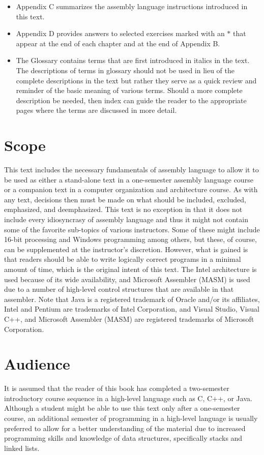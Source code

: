 \documentclass[10pt]{book}
\begin{document}
\begin{itemize}
  \item Appendix C summarizes the assembly language instructions introduced in this text.
  \item Appendix D provides answers to selected exercises marked with an $*$ that appear at the end of each chapter and at the end of Appendix B.
  \item The Glossary contains terms that are first introduced in italics in the text. The descriptions of terms in glossary should not be used in lieu of the complete descriptions in the text but rather they serve as a quick review and reminder of the basic meaning of various terms. Should a more complete description be needed, then index can guide the reader to the appropriate pages where the terms are discussed in more detail.
\end{itemize}
\section{Scope}
This text includes the necessary fundamentals of assembly language to allow it to be used as either a stand-alone text in a one-semester assembly language course or a companion text in a computer organization and architecture course. As with any text, decisions then must be made on what should be included, excluded, emphasized, and deemphasized. This text is no exception in that it does not include every idiosyncrasy of assembly language and thus it might not contain some of the favorite sub-topics of various instructors. Some of these might include 16-bit processing and Windows programming among others, but these, of course, can be supplemented at the instructor's discretion. However, what is gained is that readers should be able to write logically correct programs in a minimal amount of time, which is the original intent of this text.
The Intel architecture is used because of its wide availability, and Microsoft Assembler (MASM) is used due to a number of high-level control structures that are available in that assembler. Note that Java is a registered trademark of Oracle and/or its affiliates, Intel and Pentium are trademarks of Intel Corporation, and Visual Studio, Visual C++, and Microsoft Assembler (MASM) are registered trademarks of Microsoft Corporation.

\section{Audience}
It is assumed that the reader of this book has completed a two-semester introductory course sequence in a high-level language such as C, C++, or Java. Although a student might be able to use this text only after a one-semester course, an additional semester of programming in a high-level language is usually preferred to allow for a better understanding of the material due to increased programming skills and knowledge of data structures, specifically stacks and linked lists.
\end{document}
